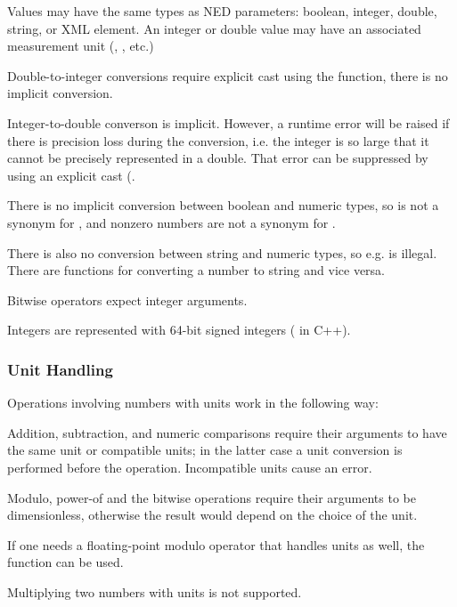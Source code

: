 Values may have the same types as NED parameters: boolean, integer, double, string, or XML element.
An integer or double value may have an associated measurement unit (, , etc.)

Double-to-integer conversions require explicit cast using the  function,
there is no implicit conversion.

Integer-to-double converson is implicit. However, a runtime error will be raised 
if there is precision loss during the conversion, i.e. the integer is so large
that it cannot be precisely represented in a double. That error can be suppressed
by using an explicit cast (. 

There is no implicit conversion between boolean and numeric types, so 
is not a synonym for , and nonzero numbers are not a synonym
for .

There is also no conversion between string and numeric types, so e.g. 
is illegal. There are functions for converting a number to string and vice versa.

Bitwise operators expect integer arguments. 

\begin{note}
Integers are represented with 64-bit signed integers ( in C++).
\end{note}


\subsubsection{Unit Handling}
\label{sec:ned-ref:unit-handling}

Operations involving numbers with units work in the following way:

Addition, subtraction, and numeric comparisons require their arguments to
have the same unit or compatible units; in the latter case a unit conversion
is performed before the operation. Incompatible units cause an error.


Modulo, power-of and the bitwise operations require their arguments to be
dimensionless, otherwise the result would depend on the choice of the unit.

\begin{note}
If one needs a floating-point modulo operator that handles units as well,
the  function can be used.
\end{note}

Multiplying two numbers with units is not supported.


